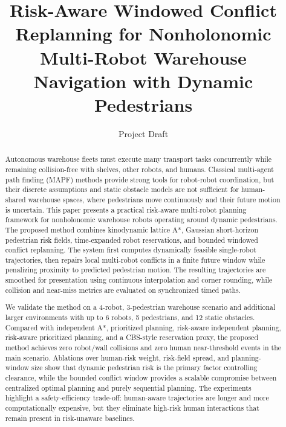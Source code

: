\documentclass[10pt,twocolumn,letterpaper]{article}
\title{Risk-Aware Windowed Conflict Replanning for Nonholonomic Multi-Robot Warehouse Navigation with Dynamic Pedestrians}
\author{Project Draft}
\date{}
\begin{document}
\maketitle

\begin{abstract}
Autonomous warehouse fleets must execute many transport tasks concurrently while remaining collision-free with shelves, other robots, and humans. Classical multi-agent path finding (MAPF) methods provide strong tools for robot-robot coordination, but their discrete assumptions and static obstacle models are not sufficient for human-shared warehouse spaces, where pedestrians move continuously and their future motion is uncertain. This paper presents a practical risk-aware multi-robot planning framework for nonholonomic warehouse robots operating around dynamic pedestrians. The proposed method combines kinodynamic lattice A*, Gaussian short-horizon pedestrian risk fields, time-expanded robot reservations, and bounded windowed conflict replanning. The system first computes dynamically feasible single-robot trajectories, then repairs local multi-robot conflicts in a finite future window while penalizing proximity to predicted pedestrian motion. The resulting trajectories are smoothed for presentation using continuous interpolation and corner rounding, while collision and near-miss metrics are evaluated on synchronized timed paths.

We validate the method on a 4-robot, 3-pedestrian warehouse scenario and additional larger environments with up to 6 robots, 5 pedestrians, and 12 static obstacles. Compared with independent A*, prioritized planning, risk-aware independent planning, risk-aware prioritized planning, and a CBS-style reservation proxy, the proposed method achieves zero robot/wall collisions and zero human near-threshold events in the main scenario. Ablations over human-risk weight, risk-field spread, and planning-window size show that dynamic pedestrian risk is the primary factor controlling clearance, while the bounded conflict window provides a scalable compromise between centralized optimal planning and purely sequential planning. The experiments highlight a safety-efficiency trade-off: human-aware trajectories are longer and more computationally expensive, but they eliminate high-risk human interactions that remain present in risk-unaware baselines.
\end{abstract}
\end{document}
